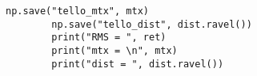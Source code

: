 \begin{lstlisting}[caption=calibration code,label=calib_code]
        np.save("tello_mtx", mtx)                                                                                                                            
        np.save("tello_dist", dist.ravel())                                                                                                                  
        print("RMS = ", ret)                                                                                                                                 
        print("mtx = \n", mtx)                                                                                                                               
        print("dist = ", dist.ravel())                                                                                                                       
\end{lstlisting}
